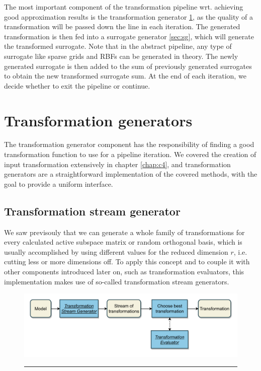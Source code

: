 \documentclass[
  a4paper,  %
  twoside,  %
  bibliography=totoc,
  headsepline,
  cleardoublepage=empty,
  parskip=half,
  draft=false
]{scrbook}
\newcommand{\delimit}{{\color{charcoal}\noindent\rule{\textwidth}{1pt}}}
\begin{document}
The most important component of the transformation pipeline wrt. achieving good approximation results is the transformation generator \ref{sec:tg}, as the quality of a transformation will be passed down the line in each iteration.
The generated transformation is then fed into a surrogate generator \ref{sec:sg}, which will generate the transformed surrogate.
Note that in the abstract pipeline, any type of surrogate like sparse grids and RBFs can be generated in theory.
The newly generated surrogate is then added to the sum of previously generated surrogates to obtain the new transformed surrogate sum.
At the end of each iteration, we decide whether to exit the pipeline or continue.


\newpage
\section {Transformation generators}
\label{sec:tg}

The transformation generator component has the responsibility of finding a good transformation function to use for a pipeline iteration.
We covered the creation of input transformation extensively in chapter \ref{chap:c4}, and transformation generators are a straightforward implementation of the covered methods, with the goal to provide a uniform interface.

\subsection {Transformation stream generator}

We saw previsouly that we can generate a whole family of transformations for every calculated active subspace matrix or random orthogonal basis, which is usually accomplished by using different values for the reduced dimension $r$, i.e. cutting less or more dimensions off.
To apply this concept and to couple it with other components introduced later on, such as transformation evaluators, this implementation makes use of so-called transformation stream generators.

\begin{mdframed}[style=style,frametitle={Transformation generator (stream-based)}]
\begin{figure}[H]
\includegraphics[width=\textwidth]{graphics/TransformationGen_Stream.pdf}
\delimit

\end{figure}
\end{mdframed}
\end{document}
